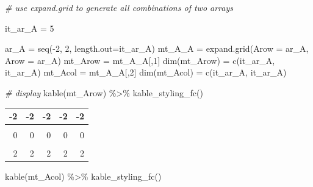 \documentclass[
]{book}
\newenvironment{Shaded}{\begin{snugshade}}{\end{snugshade}}
\newcommand{\AttributeTok}[1]{\textcolor[rgb]{0.77,0.63,0.00}{#1}}
\newcommand{\CommentTok}[1]{\textcolor[rgb]{0.56,0.35,0.01}{\textit{#1}}}
\newcommand{\DecValTok}[1]{\textcolor[rgb]{0.00,0.00,0.81}{#1}}
\newcommand{\FunctionTok}[1]{\textcolor[rgb]{0.00,0.00,0.00}{#1}}
\newcommand{\NormalTok}[1]{#1}
\newcommand{\OtherTok}[1]{\textcolor[rgb]{0.56,0.35,0.01}{#1}}
\newcommand{\SpecialCharTok}[1]{\textcolor[rgb]{0.00,0.00,0.00}{#1}}
\begin{document}
\begin{Shaded}
\begin{Highlighting}[]
\CommentTok{\# use expand.grid to generate all combinations of two arrays}

\NormalTok{it\_ar\_A }\OtherTok{=} \DecValTok{5}

\NormalTok{ar\_A }\OtherTok{=} \FunctionTok{seq}\NormalTok{(}\SpecialCharTok{{-}}\DecValTok{2}\NormalTok{, }\DecValTok{2}\NormalTok{, }\AttributeTok{length.out=}\NormalTok{it\_ar\_A)}
\NormalTok{mt\_A\_A }\OtherTok{=} \FunctionTok{expand.grid}\NormalTok{(}\AttributeTok{Arow =}\NormalTok{ ar\_A, }\AttributeTok{Arow =}\NormalTok{ ar\_A)}
\NormalTok{mt\_Arow }\OtherTok{=}\NormalTok{ mt\_A\_A[,}\DecValTok{1}\NormalTok{]}
\FunctionTok{dim}\NormalTok{(mt\_Arow) }\OtherTok{=} \FunctionTok{c}\NormalTok{(it\_ar\_A, it\_ar\_A)}
\NormalTok{mt\_Acol }\OtherTok{=}\NormalTok{ mt\_A\_A[,}\DecValTok{2}\NormalTok{]}
\FunctionTok{dim}\NormalTok{(mt\_Acol) }\OtherTok{=} \FunctionTok{c}\NormalTok{(it\_ar\_A, it\_ar\_A)}

\CommentTok{\# display}
\FunctionTok{kable}\NormalTok{(mt\_Arow) }\SpecialCharTok{\%\textgreater{}\%}
  \FunctionTok{kable\_styling\_fc}\NormalTok{()}
\end{Highlighting}
\end{Shaded}

\begin{table}[!h]
\centering
\begin{tabular}{r|r|r|r|r}
\hline
-2 & -2 & -2 & -2 & -2\\
\hline
\cellcolor{gray!6}{-1} & \cellcolor{gray!6}{-1} & \cellcolor{gray!6}{-1} & \cellcolor{gray!6}{-1} & \cellcolor{gray!6}{-1}\\
\hline
0 & 0 & 0 & 0 & 0\\
\hline
\cellcolor{gray!6}{1} & \cellcolor{gray!6}{1} & \cellcolor{gray!6}{1} & \cellcolor{gray!6}{1} & \cellcolor{gray!6}{1}\\
\hline
2 & 2 & 2 & 2 & 2\\
\hline
\end{tabular}
\end{table}

\begin{Shaded}
\begin{Highlighting}[]
\FunctionTok{kable}\NormalTok{(mt\_Acol) }\SpecialCharTok{\%\textgreater{}\%}
  \FunctionTok{kable\_styling\_fc}\NormalTok{()}
\end{Highlighting}
\end{Shaded}
\end{document}

